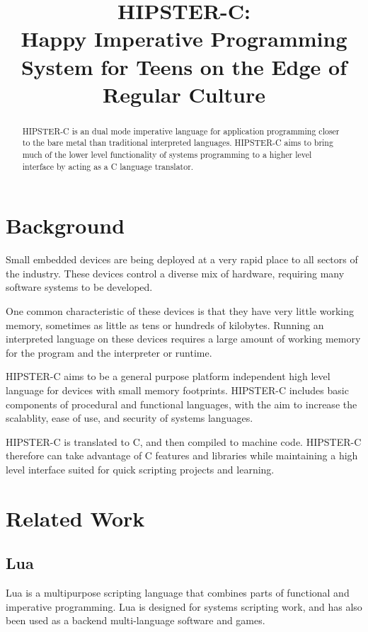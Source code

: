 \documentclass{article}
\title{HIPSTER-C:\\
       Happy Imperative Programming System for Teens on the Edge of Regular Culture}
\begin{document}
\maketitle


\begin{abstract}
  HIPSTER-C is an dual mode imperative language for application programming closer to the bare metal than traditional interpreted languages. HIPSTER-C aims to bring much of the lower level functionality of systems programming to a higher level interface by acting as a C language translator.
\end{abstract} 




\section{Background}
Small embedded devices are being deployed at a very rapid place to all sectors of the industry. These devices control a diverse mix of hardware, requiring many software systems to be developed. \par
One common characteristic of these devices is that they have very little working memory, sometimes as little as tens or hundreds of kilobytes. Running an interpreted language on these devices requires a large amount of working memory for the program and the interpreter or runtime. \par
HIPSTER-C aims to be a general purpose platform independent high level language for devices with small memory footprints. HIPSTER-C includes basic components of procedural and functional languages, with the aim to increase the scalablity, ease of use, and security of systems languages. \par 
HIPSTER-C is translated to C, and then compiled to machine code. HIPSTER-C therefore can take advantage of C features and libraries while maintaining a high level interface suited for quick scripting projects and learning. 

\section{Related Work}
\subsection{Lua}
Lua is a multipurpose scripting language that combines parts of functional and imperative programming. Lua is designed for systems scripting work, and has also been used as a backend multi-language software and games. 
\end{document}
